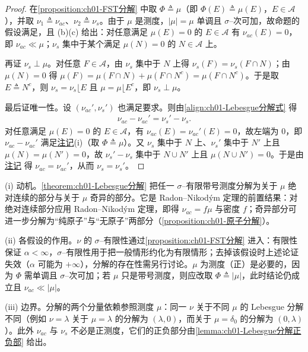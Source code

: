 \documentclass[../../main.tex]{subfiles}%
\begin{document}
\begin{proof}
在\cref{proposition:ch01-FST分解} 中取 $\Phi\triangleq\mu$（即 $\Phi(E)\triangleq\mu(E)$，$E\in\mathcal{A}$），并取 $\nu_1\triangleq\nu_{ac}$、$\nu_2\triangleq\nu_s$。由于 $\mu$ 是测度，$|\mu|=\mu$ 单调且 $\sigma$--次可加，故命题的假设满足，且 (b)(c) 给出：对任意满足 $\mu(E)=0$ 的 $E\in\mathcal{A}$ 有 $\nu_{ac}(E)=0$，即 $\nu_{ac}\ll\mu$；$\nu_s$ 集中于某个满足 $\mu(N)=0$ 的 $N\in\mathcal{A}$ 上。

再证 $\nu_s\perp\mu$。对任意 $F\in\mathcal{A}$，由 $\nu_s$ 集中于 $N$ 上得 $\nu_s(F)=\nu_s(F\cap N)$；由 $\mu(N)=0$ 得 $\mu(F)=\mu(F\cap N)+\mu(F\cap N^c)=\mu(F\cap N^c)$。于是取 $E\triangleq N^c$，则 $\nu_s=\nu_s\lfloor E$ 且 $\mu=\mu\lfloor E^c$，即 $\nu_s\perp\mu$。

最后证唯一性。设 $(\nu_{ac}',\nu_s')$ 也满足要求。则由\eqref{align:ch01-Lebesgue分解式} 得
\begin{align*}
\nu_{ac}-\nu_{ac}'=\nu_s'-\nu_s .
\end{align*}
对任意满足 $\mu(E)=0$ 的 $E\in\mathcal{A}$，有 $\nu_{ac}(E)=\nu_{ac}'(E)=0$，故左端为 $0$，即 $\nu_{ac}-\nu_{ac}'$ 满足\hyperref[remark:ch01-集中于零容量]{注记}(i)（取 $\Phi\triangleq\mu$）。又 $\nu_s$ 集中于 $N$ 上、$\nu_s'$ 集中于 $N'$ 上且 $\mu(N)=\mu(N')=0$，故 $\nu_s'-\nu_s$ 集中于 $N\cup N'$ 上且 $\mu(N\cup N')=0$。于是由\hyperref[remark:ch01-集中于零容量]{注记} 得 $\nu_{ac}=\nu_{ac}'$，从而 $\nu_s=\nu_s'$。
\end{proof}

\begin{remark}\label{remark:ch01-Lebesgue分解动机}
(i) 动机。\cref{theorem:ch01-Lebesgue分解} 把任一 $\sigma$--有限带号测度分解为关于 $\mu$ 绝对连续的部分与关于 $\mu$ 奇异的部分。它是 Radon--Nikodým 定理的前置结果：对绝对连续部分应用 Radon--Nikodým 定理，即得 $\nu_{ac}=f\mu$ 与密度 $f$；奇异部分可进一步分解为“纯原子”与“无原子”两部分（\cref{proposition:ch01-原子分解}）。

(ii) 各假设的作用。$\nu$ 的 $\sigma$--有限性通过\cref{proposition:ch01-FST分解} 进入：有限性保证 $\alpha<\infty$，$\sigma$--有限性用于把一般情形约化为有限情形；去掉该假设时上述论证失效（$\alpha$ 可能为 $+\infty$），分解的存在性需另行讨论。$\mu$ 为测度（正）是必要的，因为 $\Phi$ 需单调且 $\sigma$--次可加；若 $\mu$ 只是带号测度，则应改取 $\Phi\triangleq|\mu|$，此时结论仍成立且 $\nu_{ac}\ll|\mu|$。

(iii) 边界。分解的两个分量依赖参照测度 $\mu$：同一 $\nu$ 关于不同 $\mu$ 的 Lebesgue 分解不同（例如 $\nu=\lambda$ 关于 $\mu=\lambda$ 的分解为 $(\lambda,0)$，而关于 $\mu=\delta_0$ 的分解为 $(0,\lambda)$）。此外 $\nu_{ac}$ 与 $\nu_s$ 不必是正测度，它们的正负部分由\cref{lemma:ch01-Lebesgue分解正负部} 给出。
\end{remark}
\end{document}
